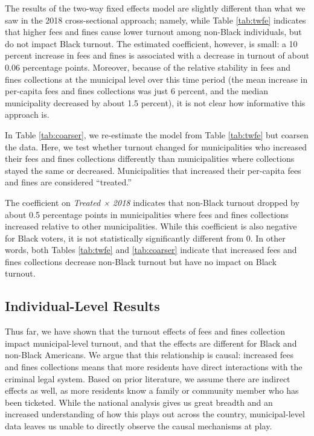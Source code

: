 \documentclass[
  12pt,
]{article}
\begin{document}
\begin{singlespace}

\end{singlespace}

The results of the two-way fixed effects model are slightly different than what we saw in the 2018 cross-sectional approach; namely, while Table \ref{tab:twfe} indicates that higher fees and fines cause lower turnout among non-Black individuals, but do not impact Black turnout. The estimated coefficient, however, is small: a 10 percent increase in fees and fines is associated with a decrease in turnout of about 0.06 percentage points. Moreover, because of the relative stability in fees and fines collections at the municipal level over this time period (the mean increase in per-capita fees and fines collections was just 6 percent, and the median municipality decreased by about 1.5 percent), it is not clear how informative this approach is.

In Table \ref{tab:coarser}, we re-estimate the model from Table \ref{tab:twfe} but coarsen the data. Here, we test whether turnout changed for municipalities who increased their fees and fines collections differently than municipalities where collections stayed the same or decreased. Municipalities that increased their per-capita fees and fines are considered ``treated.''

\begin{singlespace}

\end{singlespace}

The coefficient on \emph{Treated × 2018} indicates that non-Black turnout dropped by about 0.5 percentage points in municipalities where fees and fines collections increased relative to other municipalities. While this coefficient is also negative for Black voters, it is not statistically significantly different from 0. In other words, both Tables \ref{tab:twfe} and \ref{tab:coarser} indicate that increased fees and fines collections decrease non-Black turnout but have no impact on Black turnout.

\hypertarget{individual-level-results}{%
\subsection*{Individual-Level Results}\label{individual-level-results}}

Thus far, we have shown that the turnout effects of fees and fines collection impact municipal-level turnout, and that the effects are different for Black and non-Black Americans. We argue that this relationship is causal: increased fees and fines collections means that more residents have direct interactions with the criminal legal system. Based on prior literature, we assume there are indirect effects as well, as more residents know a family or community member who has been ticketed. While the national analysis gives us great breadth and an increased understanding of how this plays out across the country, municipal-level data leaves us unable to directly observe the causal mechanisms at play.
\end{document}
